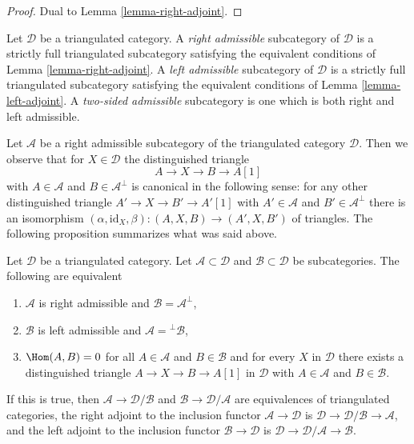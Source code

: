 \begin{proof}
Dual to Lemma \ref{lemma-right-adjoint}.
\end{proof}

\begin{definition}
\label{definition-admissible}
Let $\mathcal{D}$ be a triangulated category. A {\it right admissible}
subcategory of $\mathcal{D}$ is a strictly full triangulated subcategory
satisfying the equivalent conditions of Lemma \ref{lemma-right-adjoint}.
A {\it left admissible}
subcategory of $\mathcal{D}$ is a strictly full triangulated subcategory
satisfying the equivalent conditions of Lemma \ref{lemma-left-adjoint}.
A {\it two-sided admissible} subcategory is one which is both
right and left admissible.
\end{definition}

\noindent
Let $\mathcal{A}$ be a right admissible subcategory of the triangulated
category $\mathcal{D}$. Then we observe that for $X \in \mathcal{D}$
the distinguished triangle
$$
A \to X \to B \to A[1]
$$
with $A \in \mathcal{A}$ and $B \in \mathcal{A}^\perp$
is canonical in the following sense: for any other distinguished triangle
$A' \to X \to B' \to A'[1]$ with $A' \in \mathcal{A}$ and
$B' \in \mathcal{A}^\perp$ there is an isomorphism
$(\alpha, \text{id}_X, \beta) : (A, X, B) \to (A', X, B')$
of triangles. The following proposition summarizes what was said above.

\begin{proposition}
\label{proposition-summarize-admissible}
Let $\mathcal{D}$ be a triangulated category. Let
$\mathcal{A} \subset \mathcal{D}$ and $\mathcal{B} \subset \mathcal{D}$
be subcategories. The following are equivalent
\begin{enumerate}
\item $\mathcal{A}$ is right admissible and $\mathcal{B} = \mathcal{A}^\perp$,
\item $\mathcal{B}$ is left admissible and $\mathcal{A} = {}^\perp\mathcal{B}$,
\item $\Hom(A, B) = 0$ for all $A \in \mathcal{A}$ and $B \in \mathcal{B}$
and for every $X$ in $\mathcal{D}$ there exists a distinguished triangle
$A \to X \to B \to A[1]$ in $\mathcal{D}$ with $A \in \mathcal{A}$ and
$B \in \mathcal{B}$.
\end{enumerate}
If this is true, then
$\mathcal{A} \to \mathcal{D}/\mathcal{B}$ and
$\mathcal{B} \to \mathcal{D}/\mathcal{A}$ are equivalences
of triangulated categories,
the right adjoint to the inclusion functor $\mathcal{A} \to \mathcal{D}$
is $\mathcal{D} \to \mathcal{D}/\mathcal{B} \to \mathcal{A}$, and
the left adjoint to the inclusion functor $\mathcal{B} \to \mathcal{D}$
is $\mathcal{D} \to \mathcal{D}/\mathcal{A} \to \mathcal{B}$.
\end{proposition}

